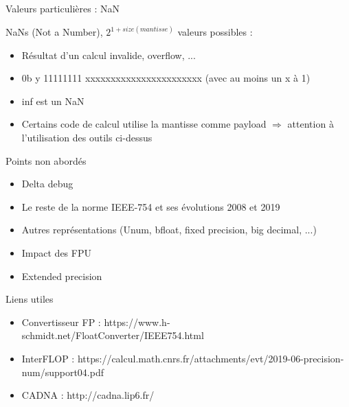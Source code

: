 \documentclass{beamer}
\begin{document}
  \begin{frame}{Valeurs particulières : NaN}
      \begin{large}
  NaNs (Not a Number), $2^{1+size(mantisse)}$ valeurs possibles :
  \begin{itemize}
  \item Résultat d'un calcul invalide, overflow, ...
  \item 0b \textcolor{SignColor}{y} \textcolor{ExponentColor}{11111111} \textcolor{FractionColor}{xxxxxxxxxxxxxxxxxxxxxxx} (avec au moins un x à 1)\\
  \item inf est un NaN
  \item Certains code de calcul utilise la mantisse comme payload $\Rightarrow$ attention à l'utilisation des outils ci-dessus
  \end{itemize}
        \end{large}
  \end{frame}

  \begin{frame}{Points non abordés}
  \begin{itemize}
  \item Delta debug
  \item Le reste de la norme IEEE-754 et ses évolutions 2008 et 2019
  \item Autres représentations (Unum, bfloat, fixed precision, big decimal, ...)
  \item Impact des FPU
  \item Extended precision
  \end{itemize}
  \end{frame}

  \begin{frame}{Liens utiles}
  \begin{itemize}
  \item Convertisseur FP : https://www.h-schmidt.net/FloatConverter/IEEE754.html
  \item InterFLOP : https://calcul.math.cnrs.fr/attachments/evt/2019-06-precision-num/support04.pdf
  \item CADNA : http://cadna.lip6.fr/
  \end{itemize}
  \end{frame}
\end{document}
